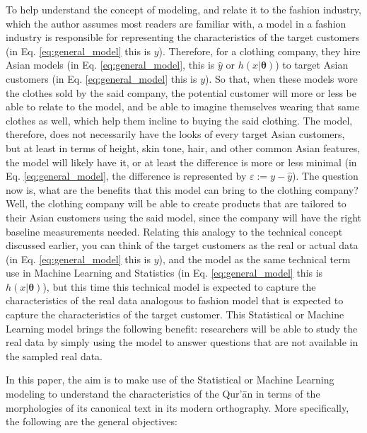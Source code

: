To help understand the concept of modeling, and relate it to the fashion industry, which the author assumes most readers are familiar with, a model in a fashion industry is responsible for representing the characteristics of the target customers (in Eq. \ref{eq:general_model} this is $y$). Therefore, for a clothing company, they hire Asian models (in Eq. \ref{eq:general_model}, this is $\hat{y}$ or $h(x|\mathbf{\theta})$) to target Asian customers (in Eq. \ref{eq:general_model} this is $y$). So that, when these models wore the clothes sold by the said company, the potential customer will more or less be able to relate to the model, and be able to imagine themselves wearing that same clothes as well, which help them incline to buying the said clothing. The model, therefore, does not necessarily have the looks of every target Asian customers, but at least in terms of height, skin tone, hair, and other common Asian features, the model will likely have it, or at least the difference is more or less minimal (in Eq. \ref{eq:general_model}, the difference is represented by $\varepsilon:=y-\hat{y}$). The question now is, what are the benefits that this model can bring to the clothing company? Well, the clothing company will be able to create products that are tailored to their Asian customers using the said model, since the company will have the right baseline measurements needed. Relating this analogy to the technical concept discussed earlier, you can think of the target customers as the
real or actual data (in Eq. \ref{eq:general_model} this is $y$), and the model as the same technical term use in Machine Learning and Statistics (in Eq. \ref{eq:general_model} this is $h(x|\mathbf{\theta})$), but this time this technical model is expected to capture the characteristics of the real data analogous to fashion model that is expected to capture the characteristics of the target customer. This Statistical or Machine Learning model brings the following benefit: researchers will be able to study the real data by simply using the model to answer questions that are not available in the sampled real data.

In this paper, the aim is to make use of the Statistical or Machine Learning modeling to understand the characteristics of the Qur'\=an in terms of the morphologies of its canonical text in its modern orthography. More specifically, the following are the general objectives:

